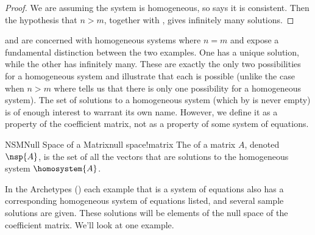 %
\begin{proof}
We are assuming the system is homogeneous, so  says it is consistent.  Then the hypothesis that $n>m$, together with , gives infinitely many solutions.
\end{proof}
%
 and  are concerned with homogeneous systems where $n=m$ and expose a fundamental distinction between the two examples.  One has a unique solution, while the other has infinitely many.  These are exactly the only two possibilities for a homogeneous system and illustrate that each is possible (unlike the case when $n>m$ where  tells us that there is only one possibility for a homogeneous system).
%
%
%
The set of solutions to a homogeneous system (which by  is never empty) is of enough interest to warrant its own name.  However, we define it as a property of the coefficient matrix, not as a property of some system of equations.
%
\begin{definition}{NSM}{Null Space of a Matrix}{null space!matrix}
The  of a matrix $A$, denoted $\nsp{A}$, is the set of all the vectors that are solutions to the homogeneous system $\homosystem{A}$.
\end{definition}
%
In the Archetypes () each example that is a system of equations also has a corresponding homogeneous system of equations listed, and several sample solutions are given.  These solutions will be elements of the null space of the coefficient matrix.  We'll look at one example.
%
